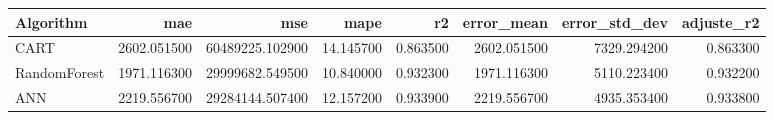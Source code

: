 \begin{tabular}{lrrrrrrr}
\toprule
Algorithm & mae & mse & mape & r2 & error_mean & error_std_dev & adjuste_r2 \\
\midrule
CART & 2602.051500 & 60489225.102900 & 14.145700 & 0.863500 & 2602.051500 & 7329.294200 & 0.863300 \\
RandomForest & 1971.116300 & 29999682.549500 & 10.840000 & 0.932300 & 1971.116300 & 5110.223400 & 0.932200 \\
ANN & 2219.556700 & 29284144.507400 & 12.157200 & 0.933900 & 2219.556700 & 4935.353400 & 0.933800 \\
\bottomrule
\end{tabular}
